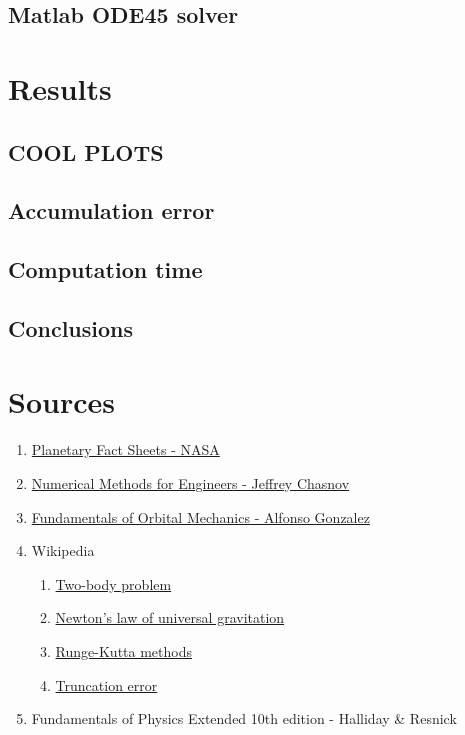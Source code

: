 \documentclass[english,12pt,a4paper]{report}
\begin{document}
	\section{Matlab ODE45 solver}
	
	\chapter{Results}
	
	\section{COOL PLOTS}
	
	\section{Accumulation error}
	
	\section{Computation time}
	
	\section{Conclusions}
	
	
	\appendix
	\chapter{Sources}
	\begin{enumerate}
		\item \href{https://nssdc.gsfc.nasa.gov/planetary/planetfact.html}{Planetary Fact Sheets - NASA}
		\item \href{https://www.youtube.com/playlist?list=PLkZjai-2Jcxn35XnijUtqqEg0Wi5Sn8ab}{Numerical Methods for Engineers - Jeffrey Chasnov}
		\item \href{https://www.youtube.com/playlist?list=PLOIRBaljOV8hBJS4m6brpmUrncqkyXBjB}{Fundamentals of Orbital Mechanics - Alfonso Gonzalez}
		\item Wikipedia
		\begin{enumerate}
			\item \href{https://en.wikipedia.org/wiki/Two-body_problem}{Two-body problem}
			\item \href{https://en.wikipedia.org/wiki/Newton%27s_law_of_universal_gravitation}{Newton's law of universal gravitation}
			\item \href{https://en.wikipedia.org/wiki/Runge%E2%80%93Kutta_methods}{Runge-Kutta methods}
			\item \href{https://en.wikipedia.org/wiki/Truncation_error_(numerical_integration)}{Truncation error}
		\end{enumerate}
		\item Fundamentals of Physics Extended 10th edition - Halliday \& Resnick
	\end{enumerate}
\end{document}
